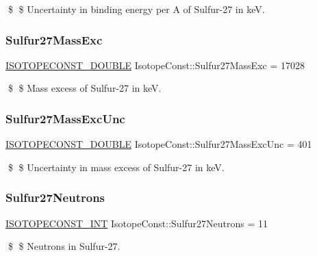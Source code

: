 \$ \$ Uncertainty in binding energy per A of Sulfur-\/27 in keV. \mbox{\label{group___isotope_const-_sulfur-_s27_gacfd9a36b3835962eea568c7780d23ff5}} 
\subsubsection{\texorpdfstring{Sulfur27\+Mass\+Exc}{Sulfur27MassExc}}
{\footnotesize\ttfamily \mbox{\hyperlink{group___isotope_const-_macros_ga8f45a7272ce02c0b4c65c44636ed719a}{I\+S\+O\+T\+O\+P\+E\+C\+O\+N\+S\+T\+\_\+\+D\+O\+U\+B\+LE}} Isotope\+Const\+::\+Sulfur27\+Mass\+Exc = 17028}

\$ \$ Mass excess of Sulfur-\/27 in keV. \mbox{\label{group___isotope_const-_sulfur-_s27_ga1f22a8e682a3324f15ef79d17f654970}} 
\subsubsection{\texorpdfstring{Sulfur27\+Mass\+Exc\+Unc}{Sulfur27MassExcUnc}}
{\footnotesize\ttfamily \mbox{\hyperlink{group___isotope_const-_macros_ga8f45a7272ce02c0b4c65c44636ed719a}{I\+S\+O\+T\+O\+P\+E\+C\+O\+N\+S\+T\+\_\+\+D\+O\+U\+B\+LE}} Isotope\+Const\+::\+Sulfur27\+Mass\+Exc\+Unc = 401}

\$ \$ Uncertainty in mass excess of Sulfur-\/27 in keV. \mbox{\label{group___isotope_const-_sulfur-_s27_ga24fa6e7fe4263024110b547db50b06a0}} 
\subsubsection{\texorpdfstring{Sulfur27\+Neutrons}{Sulfur27Neutrons}}
{\footnotesize\ttfamily \mbox{\hyperlink{group___isotope_const-_macros_ga5f18360b3e99483a35c32d789e62621c}{I\+S\+O\+T\+O\+P\+E\+C\+O\+N\+S\+T\+\_\+\+I\+NT}} Isotope\+Const\+::\+Sulfur27\+Neutrons = 11}

\$ \$ Neutrons in Sulfur-\/27. \mbox{\label{group___isotope_const-_sulfur-_s27_ga0a93ff1c5d99f6dde8f8ac2922797aa4}} 
